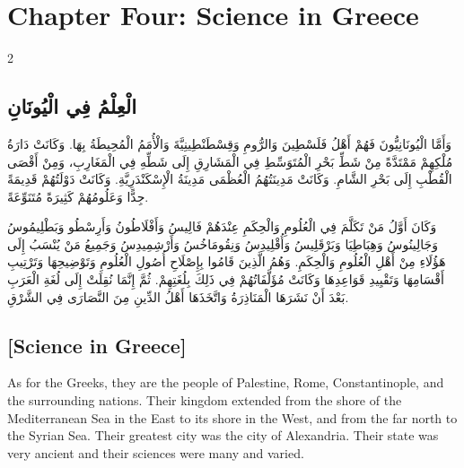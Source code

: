 \documentclass[11pt,a4paper]{article}
\newcommand{\ar}[1]{\arabicfont\beginR #1\endR}
\begin{document}
\clearpage

\section*{Chapter Four: Science in Greece}

\begin{paracol}{2}
\sloppy

\begin{leftcolumn}
\subsection*{\ar{الْعِلْمُ فِي الْيُونَانِ}}
\vspace{0.3cm}
{\arabicfont\beginR
وَأَمَّا الْيُونَانِيُّونَ فَهُمْ أَهْلُ فَلَسْطِينَ وَالرُّومِ وَقِسْطَنْطِينِيَّةَ وَالْأُمَمُ الْمُحِيطَةُ بِهَا. وَكَانَتْ دَارَةُ مُلْكِهِمْ مَمْتَدَّةً مِنْ شَطِّ بَحْرِ الْمُتَوَسِّطِ فِي الْمَشَارِقِ إِلَى شَطِّهِ فِي الْمَغَارِبِ، وَمِنْ أَقْصَى الْقُطْبِ إِلَى بَحْرِ الشَّامِ. وَكَانَتْ مَدِينَتُهُمُ الْعُظْمَى مَدِينَةُ الْإِسْكَنْدَرِيَّةِ. وَكَانَتْ دَوْلَتُهُمْ قَدِيمَةً جِدًّا وَعَلُومُهُمْ كَثِيرَةً مُتَنَوِّعَةً.
\endR}

\vspace{0.3cm}
{\arabicfont\beginR
وَكَانَ أَوَّلُ مَنْ تَكَلَّمَ فِي الْعُلُومِ وَالْحِكَمِ عِنْدَهُمْ فَالِيسُ وَأَفْلَاطُونُ وَأَرِسْطُو وَبَطْلِيمُوسُ وَجَالِينُوسُ وَهِبَاطِيَا وَبَرْقَلِيسُ وَأُقْلِيدِسُ وَنِقُومَاخُسُ وَأَرْشِمِيدِسُ وَجَمِيعُ مَنْ يُنْسَبُ إِلَى هَؤُلَاءِ مِنْ أَهْلِ الْعُلُومِ وَالْحِكَمِ. وَهُمُ الَّذِينَ قَامُوا بِإِصْلَاحِ أُصُولِ الْعُلُومِ وَتَوْضِيحِهَا وَتَرْتِيبِ أَقْسَامِهَا وَتَقْيِيدِ قَوَاعِدِهَا وَكَانَتْ مُؤَلَّفَاتُهُمْ فِي ذَلِكَ بِلُغَتِهِمْ. ثُمَّ إِنَّمَا نُقِلَتْ إِلَى لُغَةِ الْعَرَبِ بَعْدَ أَنْ نَشَرَهَا الْمَنَاذِرَةُ وَاتَّخَذَهَا أَهْلُ الدِّينِ مِنَ النَّصَارَى فِي الشَّرْقِ.
\endR}
\end{leftcolumn}

\begin{rightcolumn}
\subsection*{[Science in Greece]}
\vspace{0.3cm}
As for the Greeks, they are the people of Palestine, Rome, Constantinople, and the surrounding nations. Their kingdom extended from the shore of the Mediterranean Sea in the East to its shore in the West, and from the far north to the Syrian Sea. Their greatest city was the city of Alexandria. Their state was very ancient and their sciences were many and varied.


\end{rightcolumn}
\end{paracol}
\end{document}
